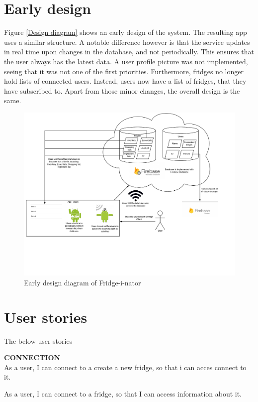 \documentclass[12pt]{article}
\begin{document}
\section{Early design}
Figure \ref{Design diagram} shows an early design of the system. The resulting app uses a similar structure. A notable difference however is that the service updates in real time upon changes in the database, and not periodically. This ensures that the user always has the latest data. A user profile picture was not implemented, seeing that it was not one of the first priorities. Furthermore, fridges no longer hold lists of connected users. Instead, users now have a list of fridges, that they have subscribed to. Apart from those minor changes, the overall design is the same.
\begin{figure}[H]
	\centering
	\includegraphics[width=180mm]{Img/Fridge_some_diagram.pdf}
	\caption{Early design diagram of Fridge-i-nator}
	\label{fig:Design diagram}
\end{figure}

\section{User stories}
The below user stories 

\textbf{CONNECTION}\\

As a user, I can connect to a create a new fridge, so that i can acces connect to it.

As a user, I can connect to a fridge, so that I can access information about it.
\end{document}
